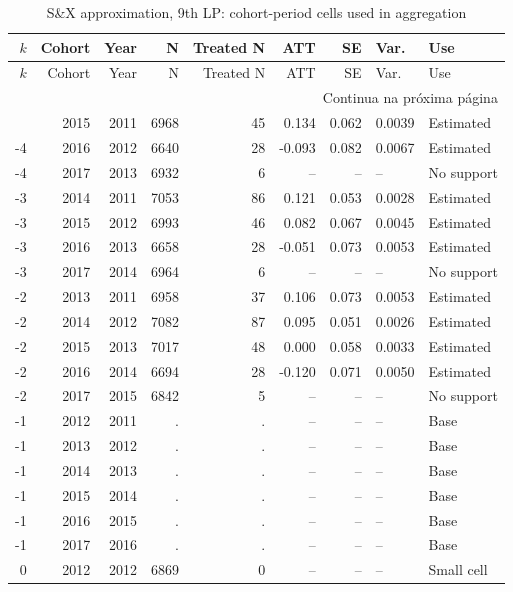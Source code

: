 ﻿\begingroup
\tiny
\setlength{\tabcolsep}{2.2pt}
\renewcommand{\arraystretch}{0.82}
\begin{longtable}{rrrrrrrll}
\caption{S\&X approximation, 9th LP: cohort-period cells used in aggregation}
\label{tab:ap_sx_celulas_9th_lp}\\
\toprule
\(k\) & Cohort & Year & N & Treated N & ATT & SE & Var. & Use \\
\midrule
\endfirsthead
\toprule
\(k\) & Cohort & Year & N & Treated N & ATT & SE & Var. & Use \\
\midrule
\endhead
\midrule
\multicolumn{9}{r}{Continua na próxima página} \\
\endfoot
\bottomrule
\endlastfoot
-4 & 2015 & 2011 & 6968 & 45 & 0.134 & 0.062 & 0.0039 & Estimated \\
-4 & 2016 & 2012 & 6640 & 28 & -0.093 & 0.082 & 0.0067 & Estimated \\
-4 & 2017 & 2013 & 6932 & 6 & -- & -- & -- & No support \\
-3 & 2014 & 2011 & 7053 & 86 & 0.121 & 0.053 & 0.0028 & Estimated \\
-3 & 2015 & 2012 & 6993 & 46 & 0.082 & 0.067 & 0.0045 & Estimated \\
-3 & 2016 & 2013 & 6658 & 28 & -0.051 & 0.073 & 0.0053 & Estimated \\
-3 & 2017 & 2014 & 6964 & 6 & -- & -- & -- & No support \\
-2 & 2013 & 2011 & 6958 & 37 & 0.106 & 0.073 & 0.0053 & Estimated \\
-2 & 2014 & 2012 & 7082 & 87 & 0.095 & 0.051 & 0.0026 & Estimated \\
-2 & 2015 & 2013 & 7017 & 48 & 0.000 & 0.058 & 0.0033 & Estimated \\
-2 & 2016 & 2014 & 6694 & 28 & -0.120 & 0.071 & 0.0050 & Estimated \\
-2 & 2017 & 2015 & 6842 & 5 & -- & -- & -- & No support \\
-1 & 2012 & 2011 & . & . & -- & -- & -- & Base \\
-1 & 2013 & 2012 & . & . & -- & -- & -- & Base \\
-1 & 2014 & 2013 & . & . & -- & -- & -- & Base \\
-1 & 2015 & 2014 & . & . & -- & -- & -- & Base \\
-1 & 2016 & 2015 & . & . & -- & -- & -- & Base \\
-1 & 2017 & 2016 & . & . & -- & -- & -- & Base \\
0 & 2012 & 2012 & 6869 & 0 & -- & -- & -- & Small cell \\

\end{longtable}
